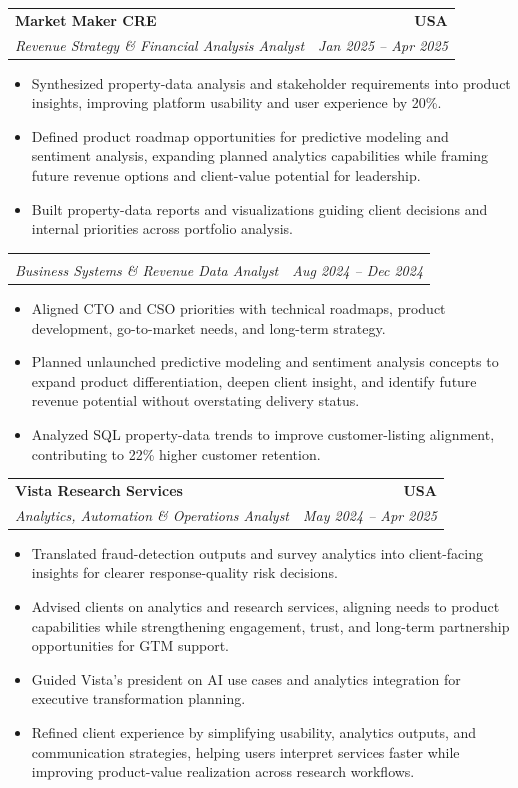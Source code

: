 \documentclass[letterpaper,10pt]{article}
\makeatletter
\newcommand{\resumeItem}[1]{\item \small{#1}}
\newcommand{\resumeSubheading}[4]{
  \vspace{1pt}\item
    \begin{tabular*}{1.0\textwidth}[t]{l@{\extracolsep{\fill}}r}
      \textbf{#1} & \textbf{\small #2} \\
      \textit{\small #3} & \textit{\small #4} \\
    \end{tabular*}\vspace{-6pt}
}
\newcommand{\resumeItemListStart}{\begin{itemize}[leftmargin=0.15in, itemsep=1pt, topsep=3pt]}
\newcommand{\resumeItemListEnd}{\end{itemize}\vspace{-2pt}}
\makeatother
\begin{document}
\vspace{-2pt}

\resumeSubheading
{Market Maker CRE}{USA}
{Revenue Strategy \& Financial Analysis Analyst}{Jan 2025 -- Apr 2025}
\resumeItemListStart
\resumeItem{Synthesized property-data analysis and stakeholder requirements into product insights, improving platform usability and user experience by 20\%.}
\resumeItem{Defined product roadmap opportunities for predictive modeling and sentiment analysis, expanding planned analytics capabilities while framing future revenue options and client-value potential for leadership.}
\resumeItem{Built property-data reports and visualizations guiding client decisions and internal priorities across portfolio analysis.}
\resumeItemListEnd

\vspace{-12pt}

\resumeSubheading
{}{}
{Business Systems \& Revenue Data Analyst}{Aug 2024 -- Dec 2024}
\resumeItemListStart
\resumeItem{Aligned CTO and CSO priorities with technical roadmaps, product development, go-to-market needs, and long-term strategy.}
\resumeItem{Planned unlaunched predictive modeling and sentiment analysis concepts to expand product differentiation, deepen client insight, and identify future revenue potential without overstating delivery status.}
\resumeItem{Analyzed SQL property-data trends to improve customer-listing alignment, contributing to 22\% higher customer retention.}
\resumeItemListEnd

\vspace{-2pt}

\resumeSubheading
{Vista Research Services}{USA}
{Analytics, Automation \& Operations Analyst}{May 2024 -- Apr 2025}
\resumeItemListStart
\resumeItem{Translated fraud-detection outputs and survey analytics into client-facing insights for clearer response-quality risk decisions.}
\resumeItem{Advised clients on analytics and research services, aligning needs to product capabilities while strengthening engagement, trust, and long-term partnership opportunities for GTM support.}
\resumeItem{Guided Vista's president on AI use cases and analytics integration for executive transformation planning.}
\resumeItem{Refined client experience by simplifying usability, analytics outputs, and communication strategies, helping users interpret services faster while improving product-value realization across research workflows.}
\resumeItemListEnd

\vspace{-2pt}
\end{document}
